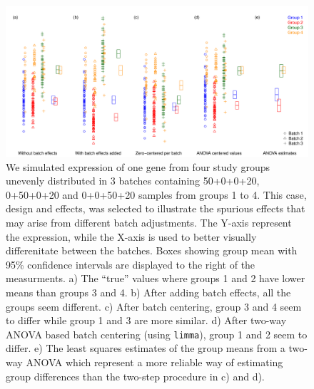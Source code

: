 \documentclass{bio}
\begin{document}
\begin{figure}[!p]
\centering\includegraphics[width=13cm]{Fig/boxplots.pdf}
\caption{We simulated expression of one gene from four study groups unevenly distributed in 3 batches containing 50+0+0+20, 0+50+0+20 and 0+0+50+20 samples from groups 1 to 4. This case, design and effects, was selected to illustrate the spurious effects that may arise from different batch adjustments. The Y-axis represent the expression, while the X-axis is used to better visually differenitate between the batches. Boxes showing group mean with 95\% confidence intervals are displayed to the right of the measurments.
a) The ``true'' values where groups 1 and 2 have lower means than groups 3 and 4.
b) After adding batch effects, all the groups seem different.
c) After batch centering, group 3 and 4 seem to differ while group 1 and 3 are more similar.
d) After two-way ANOVA based batch centering (using \texttt{limma}), group 1 and 2 seem to differ.
e) The least squares estimates of the group means from a two-way ANOVA which represent a more reliable way of estimating group differences than the two-step procedure in c) and d).
}
\label{fig:boxplots}
\end{figure}
\end{document}
